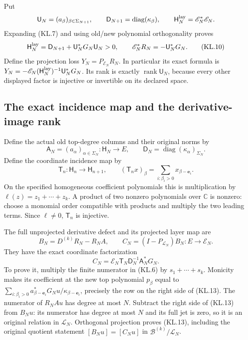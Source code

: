 Put
\[
 \mathsf U_N=(a_\beta)_{\beta\in\Sigma_{N+1}},\qquad
 \mathsf D_{N+1}=\operatorname{diag}(\kappa_\beta),\qquad
 \mathsf H_N^{\rm lay}=\mathscr E_N^*\mathscr E_N.
\]
Expanding (KL.7) and using old/new polynomial orthogonality proves
\[
 \mathsf H_N^{\rm lay}
      =\mathsf D_{N+1}+\mathsf U_N^*G_N\mathsf U_N>0,
 \qquad \mathscr E_N^*R_N=-\mathsf U_N^*G_N.              \tag{KL.10}
\]
Define the projection loss \(Y_N=P_{\mathcal E_N}R_N\).
In particular its exact formula is
\(Y_N=-\mathscr E_N(\mathsf H_N^{\rm lay})^{-1}\mathsf U_N^*G_N\).
Its rank is exactly \(\operatorname{rank}\mathsf U_N\), because
every other displayed factor is injective or invertible on its
declared space.

\subsection{The exact incidence map and the derivative-image rank}

Define the actual old top-degree columns and their original norms by
\[
 \mathsf A_N=(a_\alpha)_{\alpha\in\Sigma_N}:\mathsf H_N\to E,
 \qquad \mathsf D_N=\operatorname{diag}(\kappa_\alpha)_{\Sigma_N}.
                                                               \tag{KL.11}
\]
Define the coordinate incidence map by
\[
 \mathsf T_n:\mathsf H_n\to\mathsf H_{n+1},\qquad
 (\mathsf T_nx)_\beta=
             \sum_{i:\beta_i>0}x_{\beta-\mathbf e_i}.
                                                               \tag{KL.12}
\]
On the specified homogeneous coefficient polynomials this is
multiplication by \(\ell(z)=z_1+\cdots+z_k\).  A product of two
nonzero polynomials over \(\mathbb C\) is nonzero: choose a
monomial order compatible with products and multiply the two leading
terms.  Since \(\ell\ne0\), \(\mathsf T_n\) is injective.

The full unprojected derivative defect and its projected layer map are
\[
 B_N=D^{(k)}R_N-R_NA,\qquad
 C_N=(I-P_{\mathcal L_N})B_N:E\to\mathcal E_N.
\]
They have the exact coordinate factorization
\[
 \boxed{C_N=\mathscr E_N\mathsf T_N\mathsf D_N^{-1}
                                  \mathsf A_N^*G_N.}    \tag{KL.13}
\]
To prove it, multiply the finite numerator in (KL.6) by
\(s_1+\cdots+s_k\).  Monicity makes its coefficient at the
new top polynomial \(p_\beta\) equal to
\(\sum_{i:\beta_i>0}a_{\beta-\mathbf e_i}^*G_Nu/
\kappa_{\beta-\mathbf e_i}\), precisely the row on the right
side of (KL.13).  The numerator of \(R_NAu\) has degree at
most \(N\).  Subtract the right side of (KL.13) from \(B_Nu\):
its numerator has degree at most \(N\) and its full jet is zero,
so it is an original relation in \(\mathcal L_N\).
Orthogonal projection proves (KL.13), including the original
quotient statement \([B_Nu]=[C_Nu]\) in
\(\mathscr B^{(k)}/\mathcal L_N\).


